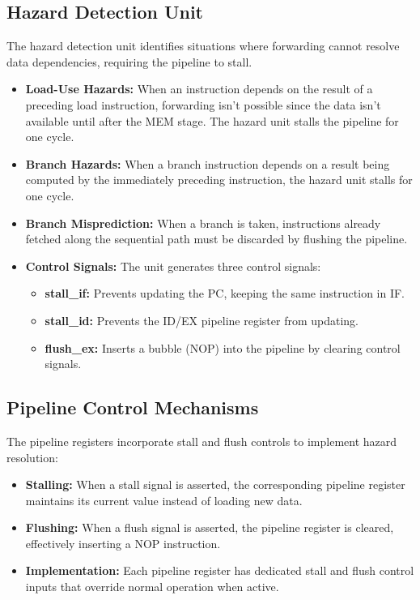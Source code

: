 \documentclass[conference]{IEEEtran}
\begin{document}
\subsection{Hazard Detection Unit}
The hazard detection unit identifies situations where forwarding cannot resolve data dependencies, requiring the pipeline to stall.

\begin{itemize}
    \item \textbf{Load-Use Hazards:} When an instruction depends on the result of a preceding load instruction, forwarding isn't possible since the data isn't available until after the MEM stage. The hazard unit stalls the pipeline for one cycle.
    
    \item \textbf{Branch Hazards:} When a branch instruction depends on a result being computed by the immediately preceding instruction, the hazard unit stalls for one cycle.
    
    \item \textbf{Branch Misprediction:} When a branch is taken, instructions already fetched along the sequential path must be discarded by flushing the pipeline.
    
    \item \textbf{Control Signals:} The unit generates three control signals:
    \begin{itemize}
        \item \textbf{stall\_if:} Prevents updating the PC, keeping the same instruction in IF.
        \item \textbf{stall\_id:} Prevents the ID/EX pipeline register from updating.
        \item \textbf{flush\_ex:} Inserts a bubble (NOP) into the pipeline by clearing control signals.
    \end{itemize}
\end{itemize}

\subsection{Pipeline Control Mechanisms}
The pipeline registers incorporate stall and flush controls to implement hazard resolution:

\begin{itemize}
    \item \textbf{Stalling:} When a stall signal is asserted, the corresponding pipeline register maintains its current value instead of loading new data.
    
    \item \textbf{Flushing:} When a flush signal is asserted, the pipeline register is cleared, effectively inserting a NOP instruction.
    
    \item \textbf{Implementation:} Each pipeline register has dedicated stall and flush control inputs that override normal operation when active.
\end{itemize}
\end{document}
